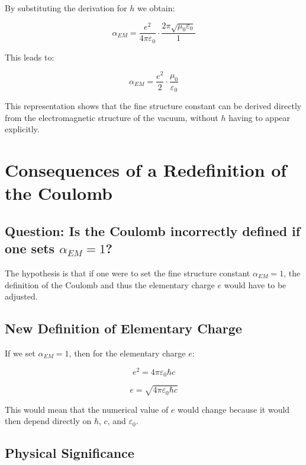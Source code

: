 \documentclass[12pt,a4paper]{article}
\begin{document}
	By substituting the derivation for $h$ we obtain:
	
	\begin{equation}
		\alpha_{EM} = \frac{e^2}{4\pi\varepsilon_0} \cdot \frac{2\pi\sqrt{\mu_0\varepsilon_0}}{1}
	\end{equation}
	
	This leads to:
	
	\begin{equation}
		\alpha_{EM} = \frac{e^2}{2} \cdot \frac{\mu_0}{\varepsilon_0}
	\end{equation}
	
	This representation shows that the fine structure constant can be derived directly from the electromagnetic structure of the vacuum, without $h$ having to appear explicitly.
	
	\section{Consequences of a Redefinition of the Coulomb}
	
	\subsection{Question: Is the Coulomb incorrectly defined if one sets $\alpha_{EM} = 1$?}
	
	The hypothesis is that if one were to set the fine structure constant $\alpha_{EM} = 1$, the definition of the Coulomb and thus the elementary charge $e$ would have to be adjusted.
	
	\subsection{New Definition of Elementary Charge}
	
	If we set $\alpha_{EM} = 1$, then for the elementary charge $e$:
	
	\begin{equation}
		e^2 = 4\pi\varepsilon_0\hbar c
	\end{equation}
	
	\begin{equation}
		e = \sqrt{4\pi\varepsilon_0\hbar c}
	\end{equation}
	
	This would mean that the numerical value of $e$ would change because it would then depend directly on $\hbar$, $c$, and $\varepsilon_0$.
	
	\subsection{Physical Significance}
	
\end{document}
